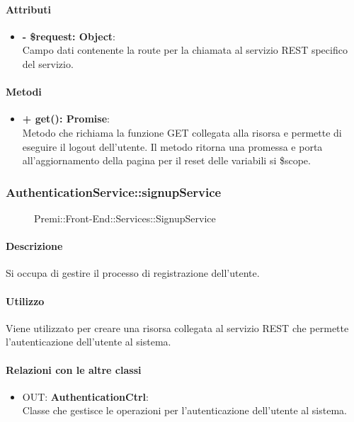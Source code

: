 		\paragraph{Attributi}
		\begin{itemize}
			\item \textbf{- \$request: Object}:\\
			Campo dati contenente la route per la chiamata al servizio REST specifico del servizio.
		\end{itemize}	
		
		\paragraph{Metodi}
		\begin{itemize}
			\item \textbf{+ get(): Promise}:\\
			Metodo che richiama la funzione GET collegata alla risorsa e permette di eseguire il logout dell'utente. Il metodo ritorna una promessa e porta all'aggiornamento della pagina per il reset delle variabili si \$scope.
		\end{itemize}
		
		
		\subsubsection{AuthenticationService::signupService}
		\begin{figure}[h]
			\centering
			\caption[Premi::Front-End::Services::SignupService]{Premi::Front-End::Services::SignupService}
		\end{figure}
		
		\paragraph{Descrizione}
		Si occupa di gestire il processo di registrazione dell'utente.
		
		\paragraph{Utilizzo}
		Viene utilizzato per creare una risorsa collegata al servizio REST che permette l'autenticazione dell'utente al sistema.
		
		\paragraph{Relazioni con le altre classi}
		\begin{itemize}
			\item OUT: \textbf{AuthenticationCtrl}:\\
			Classe che gestisce le operazioni per l'autenticazione dell'utente al sistema.
		\end{itemize}
		
